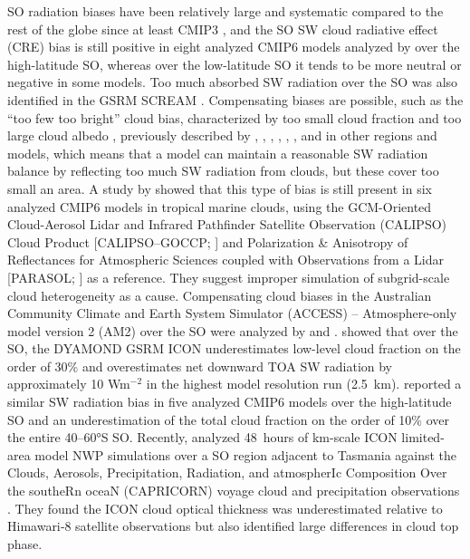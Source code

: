 \documentclass[draft]{agujournal2019}
\begin{document}
SO radiation biases have been relatively large and systematic compared to the rest of the globe since at least CMIP3 \cite{trenberth2010}, and the SO SW cloud radiative effect (CRE) bias is still positive in eight analyzed CMIP6 models analyzed by  over the high-latitude SO, whereas over the low-latitude SO it tends to be more neutral or negative in some models. Too much absorbed SW radiation over the SO was also identified in the GSRM SCREAM \cite{caldwell2021}. Compensating biases are possible, such as the ``too few too bright'' cloud bias, characterized by too small cloud fraction and too large cloud albedo \cite{wall2017,kuma2020}, previously described by , , , , , , and  in other regions and models, which means that a model can maintain a reasonable SW radiation balance by reflecting too much SW radiation from clouds, but these cover too small an area. A study by  showed that this type of bias is still present in six analyzed CMIP6 models in tropical marine clouds, using the GCM-Oriented Cloud-Aerosol Lidar and Infrared Pathfinder Satellite Observation (CALIPSO) Cloud Product [CALIPSO--GOCCP; ] and Polarization \& Anisotropy of Reflectances for Atmospheric Sciences coupled with Observations from a Lidar [PARASOL; ] as a reference. They suggest improper simulation of subgrid-scale cloud heterogeneity as a cause. Compensating cloud biases in the Australian Community Climate and Earth System Simulator (ACCESS) – Atmosphere-only model version 2 (AM2) over the SO were analyzed by  and .  showed that over the SO, the DYAMOND GSRM ICON underestimates low-level cloud fraction on the order of 30\% and overestimates net downward TOA SW radiation by approximately 10 Wm$^\mathrm{-2}$ in the highest model resolution run (2.5~km).  reported a similar SW radiation bias in five analyzed CMIP6 models over the high-latitude SO and an underestimation of the total cloud fraction on the order of 10\% over the entire 40--60°S SO. Recently,  analyzed 48~hours of km-scale ICON limited-area model NWP simulations over a SO region adjacent to Tasmania against the Clouds, Aerosols, Precipitation, Radiation, and atmospherIc Composition Over the southeRn oceaN (CAPRICORN) voyage cloud and precipitation observations \cite{mcfarquhar2021}. They found the ICON cloud optical thickness was underestimated relative to Himawari‐8 satellite observations but also identified large differences in cloud top phase.
\end{document}
